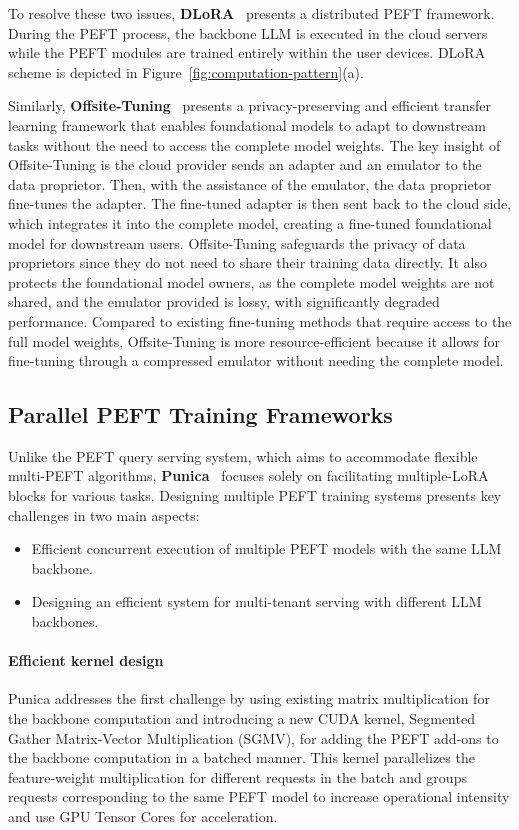 To resolve these two issues, \textbf{DLoRA}~\cite{gao2024dlora} presents a distributed PEFT framework. During the PEFT process, the backbone LLM is executed in the cloud servers while the PEFT modules are trained entirely within the user devices. DLoRA scheme is depicted in Figure~\ref{fig:computation-pattern}(a).

Similarly, \textbf{Offsite-Tuning}~\cite{offsite-tuning} presents a privacy-preserving and efficient transfer learning framework that enables foundational models to adapt to downstream tasks without the need to access the complete model weights. The key insight of Offsite-Tuning is the cloud provider sends an adapter and an emulator to the data proprietor. Then, with the assistance of the emulator, the data proprietor fine-tunes the adapter. The fine-tuned adapter is then sent back to the cloud side, which integrates it into the complete model, creating a fine-tuned foundational model for downstream users.
Offsite-Tuning safeguards the privacy of data proprietors since they do not need to share their training data directly. It also protects the foundational model owners, as the complete model weights are not shared, and the emulator provided is lossy, with significantly degraded performance. Compared to existing fine-tuning methods that require access to the full model weights, Offsite-Tuning is more resource-efficient because it allows for fine-tuning through a compressed emulator without needing the complete model.


\subsection{Parallel PEFT Training Frameworks}
\label{sec:multilora}
Unlike the PEFT query serving system, which aims to accommodate flexible multi-PEFT algorithms, \textbf{Punica}~\cite{punica} focuses solely on facilitating multiple-LoRA blocks for various tasks. Designing multiple PEFT training systems presents key challenges in two main aspects:
\begin{itemize}
    \item Efficient concurrent execution of multiple PEFT models with the same LLM backbone.
    \item Designing an efficient system for multi-tenant serving with different LLM backbones.
\end{itemize}
\paragraph{Efficient kernel design} Punica addresses the first challenge by using existing matrix multiplication for the backbone computation and introducing a new CUDA kernel, Segmented Gather Matrix-Vector Multiplication (SGMV), for adding the PEFT add-ons to the backbone computation in a batched manner. This kernel parallelizes the feature-weight multiplication for different requests in the batch and groups requests corresponding to the same PEFT model to increase operational intensity and use GPU Tensor Cores for acceleration.

